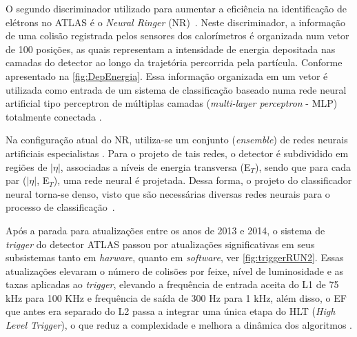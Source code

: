 O segundo discriminador utilizado para aumentar a eficiência na identificação de elétrons no ATLAS é o \emph{Neural Ringer} (NR)~\cite{anjos2006}. Neste discriminador, a informação de uma colisão registrada pelos sensores dos calorímetros é organizada num vetor de 100 posições, as quais representam a intensidade de energia depositada nas camadas do detector ao longo da trajetória percorrida pela partícula. Conforme apresentado na \autoref{fig:DepEnergia}. Essa informação organizada em um vetor é utilizada como entrada de um sistema de classificação baseado numa rede neural artificial tipo perceptron de múltiplas camadas (\emph{multi-layer perceptron} - MLP) totalmente conectada \cite{book:simonhaykin2008}.

Na configuração atual do NR, utiliza-se um conjunto (\textit{ensemble}) de redes neurais artificiais especialistas . Para o projeto de tais redes, o detector é subdividido em regiões de $|\eta|$, associadas a níveis de energia transversa (E$_T$), sendo que para cada par ($|\eta|$, E$_T$), uma rede neural é projetada. Dessa forma, o projeto do classificador neural torna-se denso, visto que são necessárias diversas redes neurais para o processo de classificação~\cite{thesis:werner2018}.





Após a parada para atualizações entre os anos de 2013 e 2014, o sistema de \textit{trigger} do detector ATLAS passou por atualizações significativas em seus subsistemas tanto em \textit{harware}, quanto em \textit{software}, ver \autoref{fig:triggerRUN2}. Essas atualizações elevaram o número de colisões por feixe, nível de luminosidade e as taxas aplicadas ao \textit{trigger}, elevando a frequência de entrada aceita do L1 de 75 kHz para 100 KHz e frequência de saída de 300 Hz para 1 kHz, além disso, o EF que antes era separado do L2 passa a integrar uma única etapa do HLT (\textit{High Level Trigger}), o que reduz a complexidade e melhora a dinâmica dos algoritmos \cite{galster2015, kilby2016, Martinez2016, Vazquez2016}.

